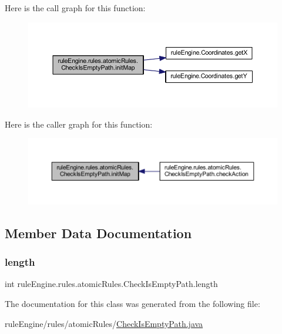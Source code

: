Here is the call graph for this function\+:
\nopagebreak
\begin{figure}[H]
\begin{center}
\leavevmode
\includegraphics[width=350pt]{classrule_engine_1_1rules_1_1atomic_rules_1_1_check_is_empty_path_a46778793a7babd4a1ed13ffdf23a3794_cgraph}
\end{center}
\end{figure}
Here is the caller graph for this function\+:
\nopagebreak
\begin{figure}[H]
\begin{center}
\leavevmode
\includegraphics[width=350pt]{classrule_engine_1_1rules_1_1atomic_rules_1_1_check_is_empty_path_a46778793a7babd4a1ed13ffdf23a3794_icgraph}
\end{center}
\end{figure}


\subsection{Member Data Documentation}
\mbox{\label{classrule_engine_1_1rules_1_1atomic_rules_1_1_check_is_empty_path_a77c893e72c47a75e302041bac3202c46}} 
\subsubsection{\texorpdfstring{length}{length}}
{\footnotesize\ttfamily int rule\+Engine.\+rules.\+atomic\+Rules.\+Check\+Is\+Empty\+Path.\+length\hspace{0.3cm}{\ttfamily [private]}}



The documentation for this class was generated from the following file\+:\begin{DoxyCompactItemize}
\item 
rule\+Engine/rules/atomic\+Rules/\mbox{\hyperlink{_check_is_empty_path_8java}{Check\+Is\+Empty\+Path.\+java}}\end{DoxyCompactItemize}
